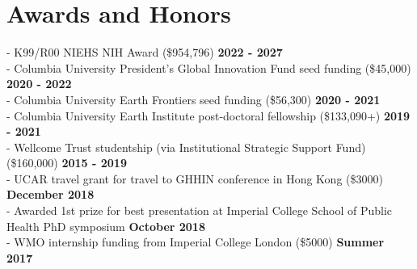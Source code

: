 \section*{Awards and Honors}
- K99/R00 NIEHS NIH Award (\$954,796) \hfill \textbf{2022 - 2027}\\
- Columbia University President’s Global Innovation Fund seed funding (\$45,000) \hfill \textbf{2020 - 2022}\\
- Columbia University Earth Frontiers seed funding (\$56,300) \hfill \textbf{2020 - 2021}\\
- Columbia University Earth Institute post-doctoral fellowship (\$133,090+) \textbf {\hfill 2019 - 2021}\\
-  Wellcome Trust studentship (via Institutional Strategic Support Fund) (\$160,000) \textbf {\hfill 2015 - 2019}\\	
- UCAR travel grant for travel to GHHIN conference in Hong Kong (\$3000) \textbf {\hfill December 2018}\\	
- Awarded 1st prize for best presentation at Imperial College School of Public Health PhD symposium \textbf {\hfill October 2018}\\
- WMO internship funding from Imperial College London (\$5000) \textbf{ {\hfill  Summer 2017}}\\

